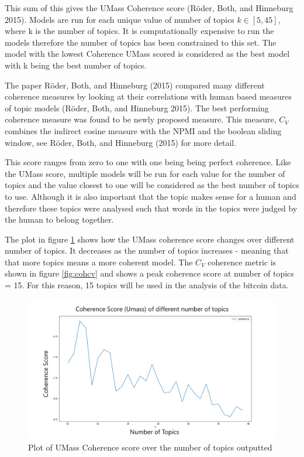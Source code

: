 \documentclass[
]{article}
\begin{document}
This sum of this gives the UMass Coherence score (Röder, Both, and
Hinneburg 2015). Models are run for each unique value of number of
topics \(k\in[5,45]\), where k is the number of topics. It is
computationally expensive to run the models therefore the number of
topics has been constrained to this set. The model with the lowest
Coherence UMass scored is considered as the best model with k being the
best number of topics.

The paper Röder, Both, and Hinneburg (2015) compared many different
coherence measures by looking at their correlations with human based
measures of topic models (Röder, Both, and Hinneburg 2015). The best
performing coherence measure was found to be newly proposed measure.
This measure, \(C_V\) combines the indirect cosine measure with the NPMI
and the boolean sliding window, see Röder, Both, and Hinneburg (2015)
for more detail.

This score ranges from zero to one with one being being perfect
coherence. Like the UMass score, multiple models will be run for each
value for the number of topics and the value closest to one will be
considered as the best number of topics to use. Although it is also
important that the topic makes sense for a human and therefore these
topics were analysed such that words in the topics were judged by the
human to belong together.

The plot in figure \ref{fig:cohumass} shows how the UMass coherence
score changes over different number of topics. It decreases as the
number of topics increases - meaning that that more topics means a more
coherent model. The \(C_V\) coherence metric is shown in figure
\ref{fig:cohcv} and shows a peak coherence score at number of topics =
15. For this reason, 15 topics will be used in the analysis of the
bitcoin data.

\begin{figure}

{\centering \includegraphics[width=1\linewidth]{images/Best_coherenceU_mass} 

}

\caption{Plot of UMass Coherence score over the number of topics outputted}\label{fig:cohumass}
\end{figure}
\end{document}
